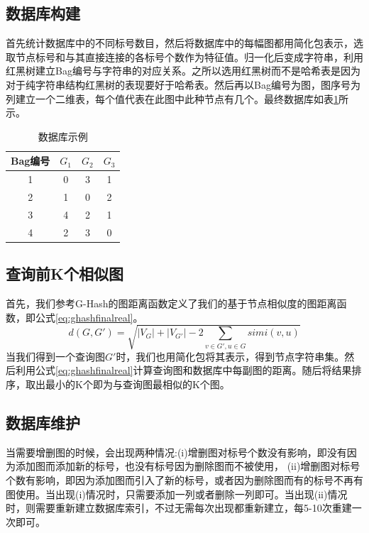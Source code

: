 \documentclass{XDBAthesis}
\begin{document}
\subsection{数据库构建}
首先统计数据库中的不同标号数目，然后将数据库中的每幅图都用简化包表示，选取节点标号和与其直接连接的各标号个数作为特征值。归一化后变成字符串，利用红黑树建立Bag编号与字符串的对应关系。之所以选用红黑树而不是哈希表是因为对于纯字符串结构红黑树的表现要好于哈希表。然后再以Bag编号为图，图序号为列建立一个二维表，每个值代表在此图中此种节点有几个。最终数据库如表\ref{tb:ghashdatabase}所示。
%
%    
\begin{table}[htb]
    \centering
    \begin{tabular}{|c|c|c|c|}
    \hline
        Bag编号 & $G_1 $ & $G_2 $ & $G_3 $ \\\hline
        1 & 0 & 3 & 1 \\\hline
        2 & 1 & 0 & 2 \\\hline
        3 & 4 & 2 & 1 \\\hline
        4 & 2 & 3 & 0 \\\hline
    \end{tabular}
    \caption{数据库示例}
    \label{tb:ghashdatabase}
\end{table}
\subsection{查询前K个相似图}
首先，我们参考G-Hash的图距离函数定义了我们的基于节点相似度的图距离函数，即公式\eqref{eq:ghashfinalreal}。
\begin{equation}
     d(G,G')=\sqrt{|V_{G}|+|V_{G'}| -2\sum_{v\in G',u\in G}simi(v,u)}
     \label{eq:ghashfinalreal}
\end{equation}
当我们得到一个查询图$G'$时，我们也用简化包将其表示，得到节点字符串集。然后利用公式\eqref{eq:ghashfinalreal}计算查询图和数据库中每副图的距离。随后将结果排序，取出最小的K个即为与查询图最相似的K个图。

\subsection{数据库维护}
当需要增删图的时候，会出现两种情况:(i)增删图对标号个数没有影响，即没有因为添加图而添加新的标号，也没有标号因为删除图而不被使用， (ii)增删图对标号个数有影响，即因为添加图而引入了新的标号，或者因为删除图而有的标号不再有图使用。当出现(i)情况时，只需要添加一列或者删除一列即可。当出现(ii)情况时，则需要重新建立数据库索引，不过无需每次出现都重新建立，每5-10次重建一次即可。
\end{document}
